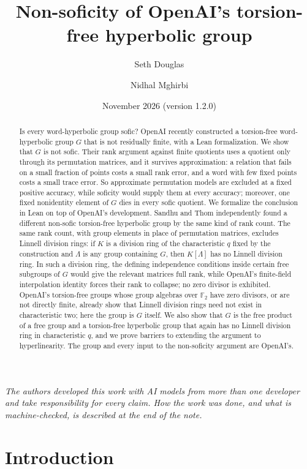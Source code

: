 \documentclass[11pt]{article}
\title{Non-soficity of OpenAI's torsion-free hyperbolic group}
\author{Seth Douglas \and Nidhal Mghirbi}
\date{November 2026 (version 1.2.0)}
\theoremstyle{definition}
\theoremstyle{remark}
\numberwithin{equation}{section}
\newcommand{\F}{\mathbb F}
\begin{document}
\maketitle

\begin{abstract}
Is every word-hyperbolic group sofic? OpenAI recently constructed a torsion-free word-hyperbolic group $G$ that is not residually finite, with a Lean formalization. We show that $G$ is not sofic. Their rank argument against finite quotients uses a quotient only through its permutation matrices, and it survives approximation: a relation that fails on a small fraction of points costs a small rank error, and a word with few fixed points costs a small trace error. So approximate permutation models are excluded at a fixed positive accuracy, while soficity would supply them at every accuracy; moreover, one fixed nonidentity element of $G$ dies in every sofic quotient. We formalize the conclusion in Lean on top of OpenAI's development. Sandhu and Thom independently found a different non-sofic torsion-free hyperbolic group by the same kind of rank count. The same rank count, with group elements in place of permutation matrices, excludes Linnell division rings: if $K$ is a division ring of the characteristic $q$ fixed by the construction and $\Lambda$ is any group containing $G$, then $K[\Lambda]$ has no Linnell division ring. In such a division ring, the defining independence conditions inside certain free subgroups of $G$ would give the relevant matrices full rank, while OpenAI's finite-field interpolation identity forces their rank to collapse; no zero divisor is exhibited. OpenAI's torsion-free groups whose group algebras over $\F_2$ have zero divisors, or are not directly finite, already show that Linnell division rings need not exist in characteristic two; here the group is $G$ itself. We also show that $G$ is the free product of a free group and a torsion-free hyperbolic group that again has no Linnell division ring in characteristic $q$, and we prove barriers to extending the argument to hyperlinearity. The group and every input to the non-soficity argument are OpenAI's.
\end{abstract}

\noindent\emph{The authors developed this work with AI models from more than one developer and take responsibility for every claim. How the work was done, and what is machine-checked, is described at the end of the note.}

\section{Introduction}\label{sec:intro}
\end{document}
